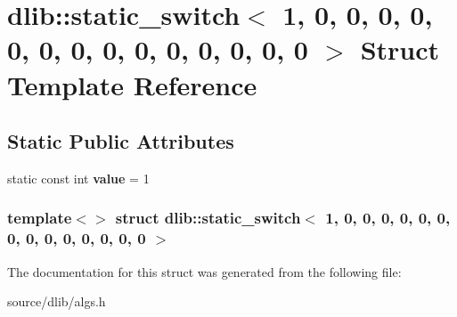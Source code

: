 \hypertarget{structdlib_1_1static__switch_3_011_00_010_00_010_00_010_00_010_00_010_00_010_00_010_00_010_00_01e6d4ee9dd0db82c25ad3e5e162ffcf57}{
\section{dlib::static\_\-switch$<$ 1, 0, 0, 0, 0, 0, 0, 0, 0, 0, 0, 0, 0, 0, 0 $>$ Struct Template Reference}
\label{structdlib_1_1static__switch_3_011_00_010_00_010_00_010_00_010_00_010_00_010_00_010_00_010_00_01e6d4ee9dd0db82c25ad3e5e162ffcf57}
}
\subsection*{Static Public Attributes}
\begin{DoxyCompactItemize}
\item 
\hypertarget{structdlib_1_1static__switch_3_011_00_010_00_010_00_010_00_010_00_010_00_010_00_010_00_010_00_01e6d4ee9dd0db82c25ad3e5e162ffcf57_aac2f646850953922ab9403d67f23005f}{
static const int {\bfseries value} = 1}
\label{structdlib_1_1static__switch_3_011_00_010_00_010_00_010_00_010_00_010_00_010_00_010_00_010_00_01e6d4ee9dd0db82c25ad3e5e162ffcf57_aac2f646850953922ab9403d67f23005f}

\end{DoxyCompactItemize}
\subsubsection*{template$<$$>$ struct dlib::static\_\-switch$<$ 1, 0, 0, 0, 0, 0, 0, 0, 0, 0, 0, 0, 0, 0, 0 $>$}



The documentation for this struct was generated from the following file:\begin{DoxyCompactItemize}
\item 
source/dlib/algs.h\end{DoxyCompactItemize}
